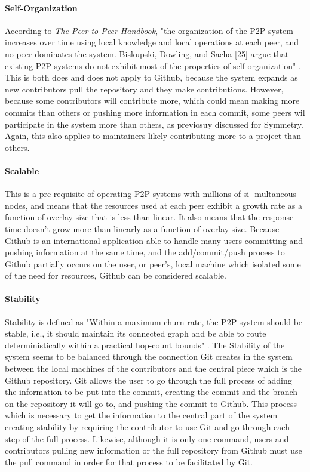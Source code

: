 \paragraph{Self-Organization}

According to \textit{The Peer to Peer Handbook}, "the organization of the P2P system increases over time using
local knowledge and local operations at each peer, and no peer dominates the
system. Biskupski, Dowling, and Sacha [25] argue that existing P2P systems do
not exhibit most of the properties of self-organization" \cite{peertopeerhandbook}. This is both does and does not apply to Github, because the system expands as new contributors pull the repository and they make contributions. However, because some contributors will contribute more, which could mean making more commits than others or pushing more information in each commit, some peers wil participate in the system more than others, as previosuy discussed for Symmetry. Again, this also applies to maintainers likely contributing more to a project than others. 

\paragraph{Scalable}

This is a pre-requisite of operating P2P systems with millions of si-
multaneous nodes, and means that the resources used at each peer exhibit
a growth rate as a function of overlay size that is less than linear. It also
means that the response time doesn’t grow more than linearly as a function of
overlay size. Because Github is an international application able to handle many users committing and pushing information at the same time, and the add/commit/push process to Github partially occurs on the user, or peer's, local machine which isolated some of the need for resources, Github can be considered scalable. 

\paragraph{Stability}

Stability is defined as "Within a maximum churn rate, the P2P system should be stable, i.e., it
should maintain its connected graph and be able to route deterministically within
a practical hop-count bounds" \cite{peertopeerhandbook}. The Stability of the system seems to be balanced through the connection Git creates in the system between the local machines of the contributors and the central piece which is the Github repository. Git allows the user to go through the full process of adding the information to be put into the commit, creating the commit and the branch on the repository it will go to, and pushing the commit to Github. This process which is necessary to get the information to the central part of the system creating stability by requiring the contributor to use Git and go through each step of the full process. Likewise, although it is only one command, users and contributors pulling new information or the full repository from Github must use the pull command in order for that process to be facilitated by Git. 


